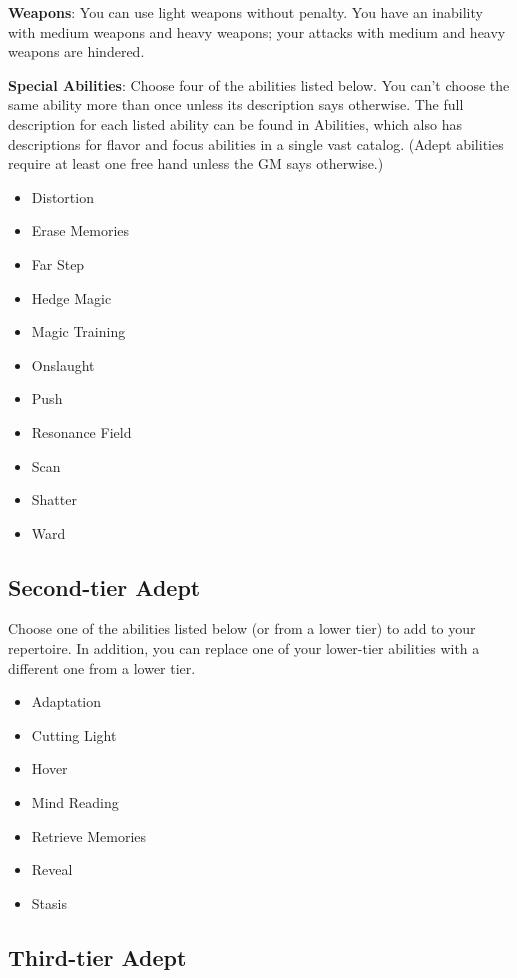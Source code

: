 \textbf{Weapons}: You can use light weapons without penalty. You have an inability with medium weapons and heavy weapons; your attacks with medium and heavy weapons are hindered.

\textbf{Special Abilities}: Choose four of the abilities listed below. You can’t choose the same ability more than once unless its description says otherwise. The full description for each listed ability can be found in Abilities, which also has descriptions for flavor and focus abilities in a single vast catalog. (Adept abilities require at least one free hand unless the GM says otherwise.)

\begin{itemize}
\item Distortion
\item Erase Memories 
\item Far Step
\item Hedge Magic
\item Magic Training
\item Onslaught
\item Push
\item Resonance Field
\item Scan
\item Shatter
\item Ward
\end{itemize}

\subsection{Second-tier Adept}

Choose one of the abilities listed below (or from a lower tier) to add to your repertoire. In addition, you can replace one of your lower-tier abilities with a different one from a lower tier.

\begin{itemize}
\item Adaptation
\item Cutting Light
\item Hover
\item Mind Reading 
\item Retrieve Memories
\item Reveal
\item Stasis
\end{itemize}

\subsection{Third-tier Adept}

